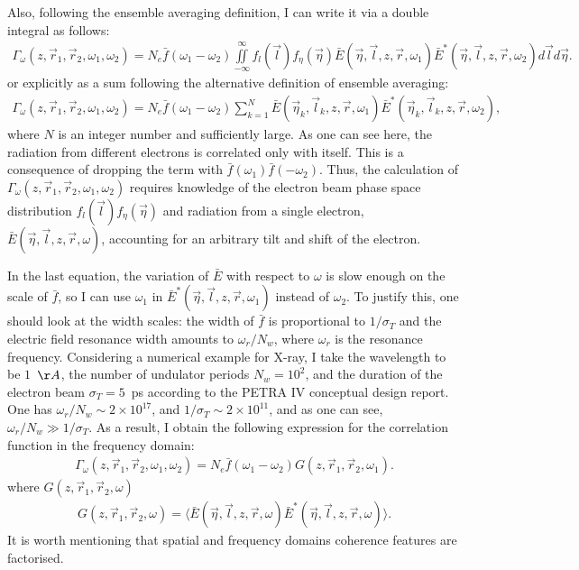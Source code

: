     Also, following the ensemble averaging definition, I can write it via a double integral as follows:
    \begin{align}
        \Gamma_\omega (z, \vec{r}_1, \vec{r}_2, \omega_1, \omega_2) = N_e \bar{f}(\omega_1 - \omega_2) \iint \limits_{-\infty}^{\infty}f_{l}(\vec{l}) f_{\eta}(\vec{\eta}) \bar{E}(\vec{\eta}, \vec{l}, z, \vec{r}, \omega_1)\bar{E}^*(\vec{\eta}, \vec{l}, z, \vec{r}, \omega_2)d\vec{l} d\vec{\eta}.
        \label{Eq:}
    \end{align} 
    or explicitly as a sum following the alternative definition of ensemble averaging:
    \begin{align}
        \Gamma_\omega (z, \vec{r}_1, \vec{r}_2, \omega_1, \omega_2) = 
        N_e \bar{f}(\omega_1 - \omega_2) \sum_{k = 1}^{N}\bar{E}(\vec{\eta}_k, \vec{l}_k, z, \vec{r}, \omega_1)\bar{E}^*(\vec{\eta}_k, \vec{l}_k, z, \vec{r}, \omega_2),
        \label{Eq:}
    \end{align} 
    where $N$ is an integer number and sufficiently large. As one can see here, the radiation from different electrons is correlated only with itself. This is a consequence of dropping the term with $\bar{f}(\omega_1)\bar{f}(-\omega_2)$. Thus, the calculation of $\Gamma_\omega (z, \vec{r}_1, \vec{r}_2, \omega_1, \omega_2)$ requires knowledge of the electron beam phase space distribution $f_{l}(\vec{l}) f_{\eta}(\vec{\eta})$ and radiation from a single electron, $\bar{E}(\vec{\eta}, \vec{l}, z, \vec{r}, \omega)$, accounting for an arbitrary tilt and shift of the electron.
        
    In the last equation, the variation of $\bar{E}$ with respect to $\omega$ is slow enough on the scale of $\bar{f}$, so I can use $\omega_1$ in $\bar{E}^*(\vec{\eta}, \vec{l}, z, \vec{r}, \omega_1)$ instead of $\omega_2$. To justify this, one should look at the width scales: the width of $\bar{f}$ is proportional to $1/\sigma_T$ and the electric field resonance width amounts to $\omega_r/N_w$, where $\omega_r$ is the resonance frequency. Considering a numerical example for X-ray, I take the wavelength to be $1$~$\AA$, the number of undulator periods $N_w = 10^2$, and the duration of the electron beam $\sigma_T = 5$~ps according to the PETRA IV conceptual design report\cite{cite}. One has $\omega_r/N_w \sim 2 \times 10^{17}$, and $1/\sigma_T \sim 2 \times 10^{11}$, and as one can see, $\omega_r/N_w \gg 1/\sigma_T$. As a result, I obtain the following expression for the correlation function in the frequency domain:
    \begin{align}
        \Gamma_\omega (z, \vec{r}_1, \vec{r}_2, \omega_1, \omega_2) = N_e \bar{f}(\omega_1 - \omega_2) G(z, \vec{r}_1, \vec{r}_2, \omega_1).
        \label{Eq:Correlation_function_und_radiation}
    \end{align}
    where $G(z, \vec{r}_1, \vec{r}_2, \omega)$
    \begin{align}
        G(z, \vec{r}_1, \vec{r}_2, \omega) = \langle\bar{E}(\vec{\eta}, \vec{l}, z, \vec{r}, \omega)\bar{E}^*(\vec{\eta}, \vec{l}, z, \vec{r}, \omega) \rangle.
        \label{Eq:Cross_spectral_density_und_radiation}
    \end{align}
    It is worth mentioning that spatial and frequency domains coherence features are factorised. 
    
